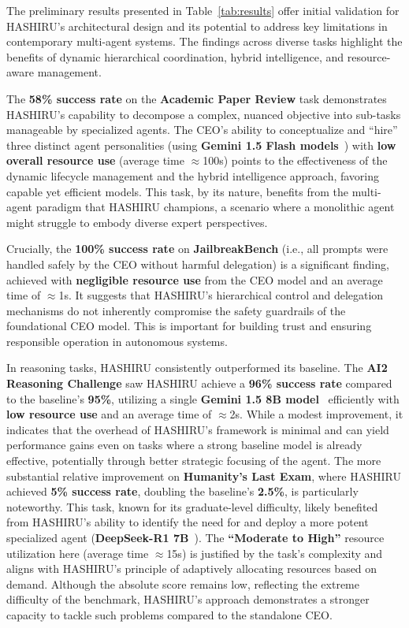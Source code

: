 \documentclass[conference]{IEEEtran}
\begin{document}
The preliminary results presented in Table~\ref{tab:results} offer initial validation for HASHIRU's architectural design and its potential to address key limitations in contemporary multi-agent systems. The findings across diverse tasks highlight the benefits of dynamic hierarchical coordination, hybrid intelligence, and resource-aware management.

The \textbf{58\% success rate} on the \textbf{Academic Paper Review} task demonstrates HASHIRU's capability to decompose a complex, nuanced objective into sub-tasks manageable by specialized agents. The CEO's ability to conceptualize and ``hire'' three distinct agent personalities (using \textbf{Gemini 1.5 Flash models}~\cite{gemini15flash}) with \textbf{low overall resource use} (average time $\approx$100s) points to the effectiveness of the dynamic lifecycle management and the hybrid intelligence approach, favoring capable yet efficient models. This task, by its nature, benefits from the multi-agent paradigm that HASHIRU champions, a scenario where a monolithic agent might struggle to embody diverse expert perspectives.

Crucially, the \textbf{100\% success rate} on \textbf{JailbreakBench} (i.e., all prompts were handled safely by the CEO without harmful delegation) is a significant finding, achieved with \textbf{negligible resource use} from the CEO model and an average time of $\approx$1s. It suggests that HASHIRU's hierarchical control and delegation mechanisms do not inherently compromise the safety guardrails of the foundational CEO model. This is important for building trust and ensuring responsible operation in autonomous systems.

In reasoning tasks, HASHIRU consistently outperformed its baseline. The \textbf{AI2 Reasoning Challenge} saw HASHIRU achieve a \textbf{96\% success rate} compared to the baseline's \textbf{95\%}, utilizing a single \textbf{Gemini 1.5 8B model}~\cite{gemini15flash8b} efficiently with \textbf{low resource use} and an average time of $\approx$2s. While a modest improvement, it indicates that the overhead of HASHIRU's framework is minimal and can yield performance gains even on tasks where a strong baseline model is already effective, potentially through better strategic focusing of the agent. The more substantial relative improvement on \textbf{Humanity's Last Exam}, where HASHIRU achieved \textbf{5\% success rate}, doubling the baseline's \textbf{2.5\%}, is particularly noteworthy. This task, known for its graduate-level difficulty, likely benefited from HASHIRU's ability to identify the need for and deploy a more potent specialized agent (\textbf{DeepSeek-R1 7B}~\cite{deepseekr1_report}). The \textbf{``Moderate to High''} resource utilization here (average time $\approx$15s) is justified by the task's complexity and aligns with HASHIRU's principle of adaptively allocating resources based on demand. Although the absolute score remains low, reflecting the extreme difficulty of the benchmark, HASHIRU's approach demonstrates a stronger capacity to tackle such problems compared to the standalone CEO.
\end{document}
